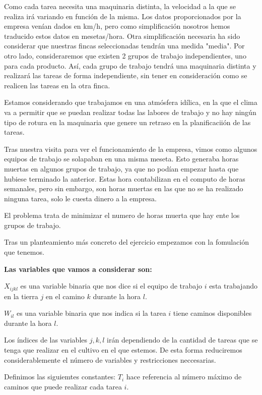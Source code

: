 Como cada tarea necesita una maquinaria distinta, la velocidad a la que se realiza irá variando en función de la misma. 
Los datos proporcionados por la empresa venían dados en km/h, pero como simplificación nosotros hemos traducido estos datos en mesetas/hora.
Otra simplificación necesaria ha sido considerar que nuestras fincas seleccionadas tendrán una medida "media". 
Por otro lado, consideraremos que existen 2 grupos de trabajo independientes, uno para cada producto. 
Así, cada grupo de trabajo tendrá una maquinaria distinta y realizará las tareas de forma independiente, sin tener en consideración como se realicen las tareas en la otra finca.

Estamos considerando que trabajamos en una atmósfera idílica, en la que el clima va a permitir que se puedan realizar todas las labores
de trabajo y no hay ningún tipo de rotura en la maquinaria que genere un retraso en la planificaciión de las tareas.

Tras nuestra visita para ver el funcionamiento de la empresa, vimos como algunos equipos de trabajo se solapaban en una misma 
meseta. Esto generaba horas muertas en algunos grupos de trabajo, ya que no podían empezar hasta que hubiese terminado la anterior. 
Estas hora contabilizan en el computo de horas semanales, pero sin embargo, son horas muertas en las que no se ha realizado ninguna tarea,
solo le cuesta dinero a la empresa. 

El problema trata de minimizar el numero de horas muerta que hay ente los grupos de trabajo. 

Tras un planteamiento más concreto del ejercicio empezamos con la fomulación que tenemos. 

\textbf{Las variables que vamos a considerar son:} 

$X_{ijkl}$ es una variable binaria que nos dice si el equipo de trabajo $i$ esta trabajando en la tierra $j$ en el camino $k$ durante 
la hora $l$.

$W_{il}$ es una variable binaria que nos indica si la tarea $i$ tiene caminos disponibles durante la hora $l$. 

Los índices de las variables $j,k,l$ irán dependiendo de la cantidad de tareas que se tenga que realizar en el cultivo en el que estemos. 
De esta forma reduciremos considerablemente el número de variables y restricciones neccesarias.

Definimos las siguiemtes constantes: 
$T_i$ hace referencia al número máximo de caminos que puede realizar cada tarea $i$. 

